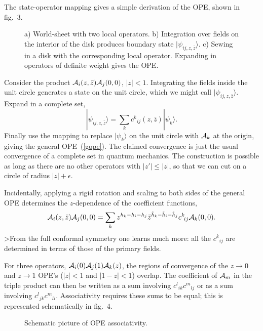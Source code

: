 The state-operator mapping gives a simple derivation of the OPE,
shown in fig.~3.
\begin{figure}
\begin{center}
\leavevmode
{}
\end{center}
\caption[]{a) World-sheet with two local operators. b)
Integration over fields on the interior of the disk produces
boundary state $| \psi_{ij,z,\bar z} \rangle$. c) Sewing in a disk
with the corresponding local operator.  Expanding in operators of
definite weight gives the OPE.}
\end{figure}
Consider the product ${\cal A}_i(z,\bar z)
{\cal A}_j(0,0)$, $|z|<1$.  Integrating the fields inside the unit
circle generates a state on the unit circle, which we might call
$| \psi_{ij,z,\bar z} \rangle$.  Expand in a complete set,
\begin{equation}
| \psi_{ij,z,\bar z} \rangle = \sum_k c^k \!_{ij}(z,\bar z)
| \psi_k \rangle.
\end{equation}
Finally use the mapping to replace $| \psi_k \rangle$
on the unit circle with ${\cal A}_k$ at the origin, giving the
general OPE~(\ref{gope}).  The claimed convergence is just the
usual convergence of a complete set in quantum mechanics.  The
construction is possible as long as there are no other operators
with $|z'| \leq |z|$, so that we can cut on a circle of radius
$|z| + \epsilon$.

Incidentally, applying a rigid rotation and scaling to both sides
of the general OPE determines the $z$-dependence of the
coefficient functions,
\begin{equation}
{\cal A}_i(z,\bar z) {\cal A}_j(0,0)
= \sum_k z^{h_k - h_i - h_j} {\bar z}^{\tilde h_k - \tilde h_i -
\tilde h_j} c^k\!_{ij}{\cal A}_k(0,0). \label{gope2}
\end{equation}
>From the full conformal symmetry one learns much more: all the
$c^k\!_{ij}$ are determined in terms of those of the primary
fields.

For three operators, ${\cal A}_i(0) {\cal A}_j(1) {\cal A}_k(z)$,
the regions of convergence of the $z \to 0$ and $z \to 1$ OPE's
($|z| < 1$ and $|1-z| < 1$) overlap.  The coefficient of ${\cal
A}_m$ in the triple product can then be written as a sum involving
$c^l\!_{ik}c^m\!_{lj}$ or as a sum involving $c^l\!_{jk}c^m\!_{li}$.
Associativity requires these sums to be equal; this is represented
schematically in fig.~4.
\begin{figure}
\begin{center}
\leavevmode
{}
\end{center}
\caption[]{Schematic picture of OPE associativity.}
\end{figure}

